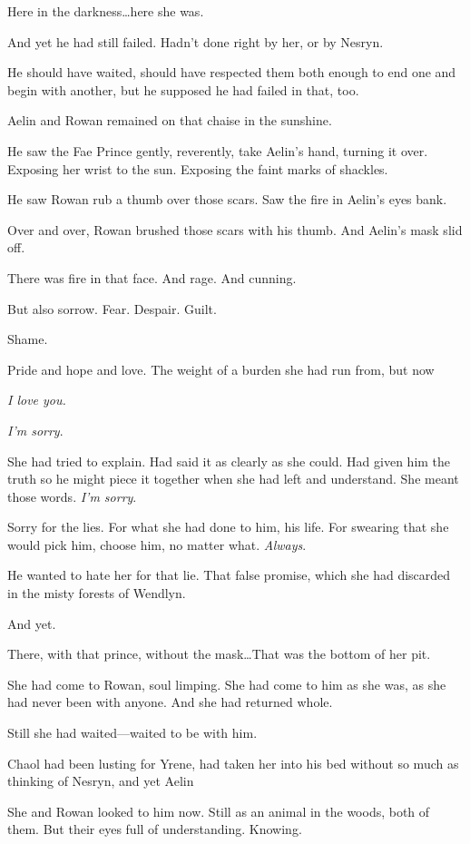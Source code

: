 Here in the darkness\ldots here she was.

And yet he had still failed.
Hadn't done right by her, or by Nesryn.

He should have waited, should have respected them both enough to end one and begin with another, but he supposed he had failed in that, too.

Aelin and Rowan remained on that chaise in the sunshine.

He saw the Fae Prince gently, reverently, take Aelin's hand, turning it over.
Exposing her wrist to the sun.
Exposing the faint marks of shackles.

He saw Rowan rub a thumb over those scars.
Saw the fire in Aelin's eyes bank.

Over and over, Rowan brushed those scars with his thumb.
And Aelin's mask slid off.

There was fire in that face.
And rage.
And cunning.

But also sorrow.
Fear.
Despair.
Guilt.

Shame.

Pride and hope and love.
The weight of a burden she had run from, but now 

\emph{I love you.}

\emph{I'm sorry}.

She had tried to explain.
Had said it as clearly as she could.
Had given him the truth so he might piece it together when she had left and understand.
She meant those words.
\emph{I'm sorry}.

Sorry for the lies.
For what she had done to him, his life.
For swearing that she would pick him, choose him, no matter what.
\emph{Always}.

He wanted to hate her for that lie.
That false promise, which she had discarded in the misty forests of Wendlyn.

And yet.

There, with that prince, without the mask\ldots That was the bottom of her pit.

She had come to Rowan, soul limping.
She had come to him as she was, as she had never been with anyone.
And she had returned whole.

Still she had waited---waited to be with him.

Chaol had been lusting for Yrene, had taken her into his bed without so much as thinking of Nesryn, and yet Aelin 

She and Rowan looked to him now.
Still as an animal in the woods, both of them.
But their eyes full of understanding.
Knowing.

